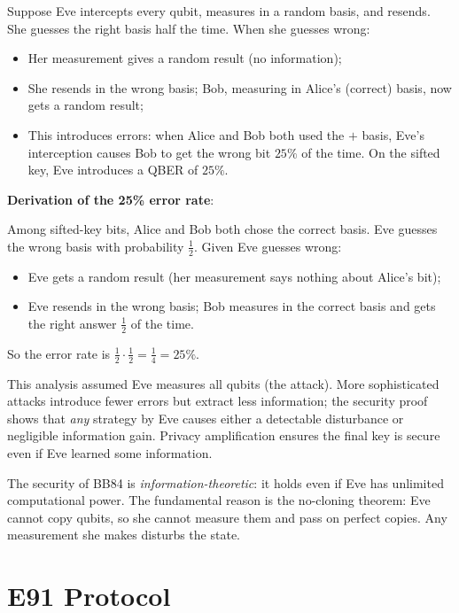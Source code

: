 \documentclass[oneside]{academica}
\begin{document}
\begin{question*}
  Suppose Eve intercepts every qubit, measures in a random basis, and resends.
  She guesses the right basis half the time.
  When she guesses wrong:
  \begin{itemize}
    \item Her measurement gives a random result (no information);
    \item She resends in the wrong basis; Bob, measuring in Alice's (correct) basis, now gets a random result;
    \item This introduces errors: when Alice and Bob both used the $+$ basis, Eve's interception causes Bob to get the wrong bit $25\%$ of the time.
      On the sifted key, Eve introduces a QBER of $25\%$.
  \end{itemize}
  
  \textbf{Derivation of the 25\% error rate}:
  
  Among sifted-key bits, Alice and Bob both chose the correct basis.
  Eve guesses the wrong basis with probability $\frac12$.
  Given Eve guesses wrong:
  \begin{itemize}
    \item Eve gets a random result (her measurement says nothing about Alice's bit);
    \item Eve resends in the wrong basis; Bob measures in the correct basis and gets the right answer $\frac12$ of the time.
  \end{itemize}
  So the error rate is $\frac12\cdot\frac12=\frac14=25\%$.
\end{question*}

\begin{note}
  This analysis assumed Eve measures all qubits (the  attack).
  More sophisticated attacks introduce fewer errors but extract less information; the security proof shows that \emph{any} strategy by Eve causes either a detectable disturbance or negligible information gain.
  Privacy amplification ensures the final key is secure even if Eve learned some information.
\end{note}

The security of BB84 is \emph{information-theoretic}: it holds even if Eve has unlimited computational power.
The fundamental reason is the no-cloning theorem: Eve cannot copy qubits, so she cannot measure them and pass on perfect copies.
Any measurement she makes disturbs the state.

\section{E91 Protocol}
\end{document}
